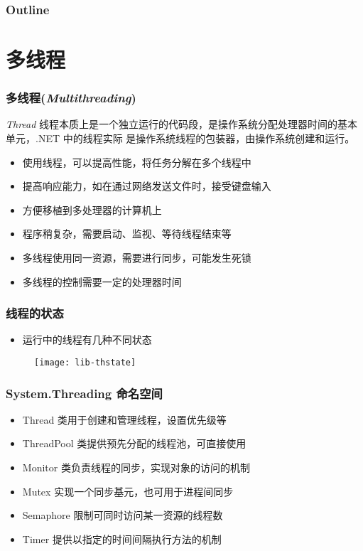 
\begin{frame}
\frametitle{Outline}            %
\tableofcontents
\end{frame}

\section{多线程}


\begin{frame}
\frametitle{多线程(\textit{Multithreading})}
\begin{block}{\textit{Thread}}
  \CJKindent 线程本质上是一个独立运行的代码段，是操作系统分配处理器时间的基本单元，.NET 中的线程实际
  是操作系统线程的包装器，由操作系统创建和运行。
\end{block}
\begin{itemize}
\item 使用线程，可以提高性能，将任务分解在多个线程中
\item 提高响应能力，如在通过网络发送文件时，接受键盘输入
\item 方便移植到多处理器的计算机上
\end{itemize}
\medskip
\begin{itemize}
\item 程序稍复杂，需要启动、监视、等待线程结束等
\item 多线程使用同一资源，需要进行同步，可能发生死锁
\item 多线程的控制需要一定的处理器时间
\end{itemize}
\end{frame}

\begin{frame}
\frametitle{线程的状态}
\begin{itemize}
\item 运行中的线程有几种不同状态
\end{itemize}
\begin{figure}
  \centering
  \texttt{[image: lib-thstate]}
\end{figure}
\end{frame}

\begin{frame}
\frametitle{System.Threading 命名空间}
\begin{itemize}
\setlength{\itemsep}{6pt plus 1pt}
\item Thread 类用于创建和管理线程，设置优先级等
\item ThreadPool 类提供预先分配的线程池，可直接使用
\item Monitor 类负责线程的同步，实现对象的访问的机制
\item Mutex 实现一个同步基元，也可用于进程间同步
\item Semaphore 限制可同时访问某一资源的线程数
\item Timer 提供以指定的时间间隔执行方法的机制
\end{itemize}
\end{frame}

